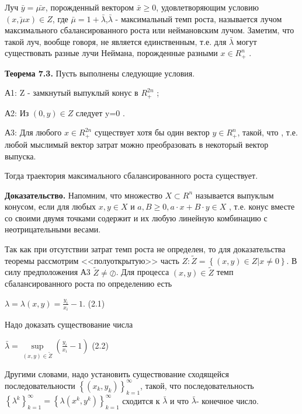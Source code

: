 \documentclass[12pt, 4paper]{book}
\begin{document}
{Луч $\bar{y}=\bar{\mu x}$, порожденный вектором $\bar{x} \geq 0$, удовлетворяющим условию $(\bar{x,\mu x}) \in Z$, где $\bar{\mu}=1+ \bar{\lambda}$,$\bar{\lambda}$  - максимальный темп роста, называется лучом максимального сбалансированного роста или неймановским лучом. Заметим, что такой луч, вообще говоря, не является единственным, т.е. для $\bar{\lambda}$ могут существовать разные лучи Неймана, порожденные разными $x \in R_{+}^{n}$ .
\par

\textbf{Теорема 7.3.} Пусть выполнены следующие условия.
\par

А1: Z - замкнутый выпуклый конус в $R_{+}^{2n}$ ;
\par

А2: Из $(0,y) \in Z$ следует y=0 .
\par

А3: Для любого $ x\in R_{+}^{2n}$ существует хотя бы один вектор $y \in R_{+}^{n}$, такой, что , т.е. любой мыслимый вектор затрат можно преобразовать в некоторый вектор выпуска.
\par

Тогда траектория максимального сбалансированного роста существует.
\par

\textbf{Доказательство.} Напомним, что множество $X \subset R^{n}$ называется выпуклым конусом, если для любых $x,y \in X$ и $a,B \geq 0, a\cdot x + B \cdot y \in X$ , т.е. конус вместе со своими двумя точками содержит и их любую линейную комбинацию с неотрицательными весами.
\par

Так как при отсутствии затрат темп роста не определен, то для доказательства теоремы рассмотрим <<полуоткрытую>> часть $Z:\tilde{Z} = \left\{(x,y) \in Z | x\neq 0\right\}  $. В силу предположения А3 $\tilde{Z} \neq \oslash$. Для процесса $(x,y)\in \tilde{Z}$ темп сбалансированного роста по определению есть
\begin{center}
$\lambda = \lambda(x,y) = \frac{y_i}{x_i}-1$. (2.1)
\end{center}
\par

Надо доказать существование числа
\begin{center}
$\bar{\lambda}=\sup\limits_{(x,y) \in \tilde{Z}}(\frac{y_i}{x_i} -1)$ (2.2)
\end{center}
\par

Другими словами, надо установить существование сходящейся последовательности $\left\{(x_k,y_k)\right\}_{k=1}^{\infty}$, такой, что последовательность $\left\{\lambda^{k}\right\}_{k=1}^{\infty} = \left\{\lambda(x^k,y^k)\right\}_{k=1}^{\infty}$ сходится к $\bar{\lambda}$ и что $\bar{\lambda}$- конечное число.
\par

}
\end{document}
